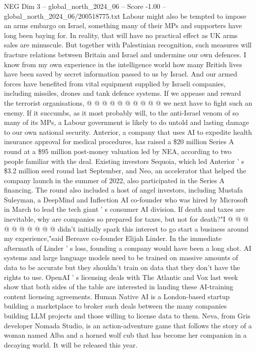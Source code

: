 \begin{textsample}{NEG Dim 3 – global\_north\_2024\_06 – Score -1.00 – global\_north\_2024\_06/200518775.txt}
Labour might also be tempted to impose an arms embargo on Israel, something many of their MPs and supporters have long been baying for.
In reality, that will have no practical effect as UK arms sales are minuscule.
But together with Palestinian recognition, such measures will fracture relations between Britain and Israel and undermine our own defences.
I know from my own experience in the intelligence world how many British lives have been saved by secret information passed to us by Israel.
And our armed forces have benefited from vital equipment supplied by Israeli companies, including missiles, drones and tank defence systems.
If we appease and reward the terrorist organisations, @ @ @ @ @ @ @ @ @ @ we next have to fight such an enemy.
If it succumbs, as it most probably will, to the anti-Israel venom of so many of its MPs, a Labour government is likely to do untold and lasting damage to our own national security.
Anterior, a company that uses AI to expedite health insurance approval for medical procedures, has raised a \$20 million Series A round at a \$95 million post-money valuation led by NEA, according to two people familiar with the deal.
Existing investors Sequoia, which led Anterior ' s \$3.2 million seed round last September, and Neo, an accelerator that helped the company launch in the summer of 2022, also participated in the Series A financing.
The round also included a host of angel investors, including Mustafa Suleyman, a DeepMind and Inflection AI co-founder who was hired by Microsoft in March to lead the tech giant ' s consumer AI division.
If death and taxes are inevitable, why are companies so prepared for taxes, but not for death?"I @ @ @ @ @ @ @ @ @ @ didn't initially spark this interest to go start a business around my experience,"said Bereave co-founder Elijah Linder.
In the immediate aftermath of Linder ' s loss, founding a company would have been a long shot.
AI systems and large language models need to be trained on massive amounts of data to be accurate but they shouldn't train on data that they don't have the rights to use.
OpenAI ' s licensing deals with The Atlantic and Vox last week show that both sides of the table are interested in landing these AI-training content licensing agreements.
Human Native AI is a London-based startup building a marketplace to broker such deals between the many companies building LLM projects and those willing to license data to them.
Neva, from Gris developer Nomada Studio, is an action-adventure game that follows the story of a woman named Alba and a horned wolf cub that has become her companion in a decaying world.
It will be released this year.

\end{textsample}
